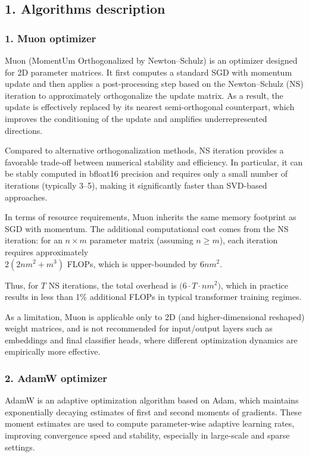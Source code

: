 \documentclass[
]{article}
\author{}
\date{}
\begin{document}
\hypertarget{algorithms-description}{%
\subsection{1. Algorithms description}\label{algorithms-description}}

\hypertarget{muon-optimizer}{%
\subsubsection{1. Muon optimizer}\label{muon-optimizer}}

Muon (MomentUm Orthogonalized by Newton--Schulz) is an optimizer
designed for 2D parameter matrices. It first computes a standard SGD
with momentum update and then applies a post-processing step based on
the Newton--Schulz (NS) iteration to approximately orthogonalize the
update matrix. As a result, the update is effectively replaced by its
nearest semi-orthogonal counterpart, which improves the conditioning of
the update and amplifies underrepresented directions.

Compared to alternative orthogonalization methods, NS iteration provides
a favorable trade-off between numerical stability and efficiency. In
particular, it can be stably computed in bfloat16 precision and requires
only a small number of iterations (typically 3--5), making it
significantly faster than SVD-based approaches.

In terms of resource requirements, Muon inherits the same memory
footprint as SGD with momentum. The additional computational cost comes
from the NS iteration: for an \(n \times m\) parameter matrix (assuming
\(n \ge m\)), each iteration requires approximately\\
\(2(2nm^2 + m^3)\) FLOPs, which is upper-bounded by \(6nm^2\).

Thus, for \(T\) NS iterations, the total overhead is
\(\mathcal(6\cdot T \cdot nm^2)\), which in practice results in less
than 1\% additional FLOPs in typical transformer training regimes.

As a limitation, Muon is applicable only to 2D (and higher-dimensional
reshaped) weight matrices, and is not recommended for input/output
layers such as embeddings and final classifier heads, where different
optimization dynamics are empirically more effective. 
\subsubsection{ 2. AdamW optimizer}
AdamW is an adaptive optimization algorithm based on Adam,
which maintains exponentially decaying estimates of first and second
moments of gradients. These moment estimates are used to compute
parameter-wise adaptive learning rates, improving convergence speed and
stability, especially in large-scale and sparse settings.
\end{document}

